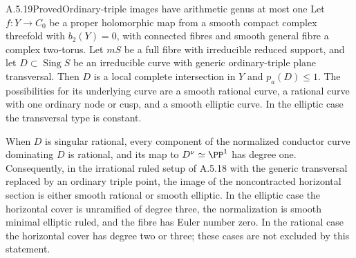 \begin{statement}{A.5.19}{Proved}{Ordinary-triple images have arithmetic genus at most one}
Let $f:Y\to C_0$ be a proper holomorphic map from a smooth
compact complex threefold with $b_2(Y)=0$, with connected
fibres and smooth general fibre a complex two-torus.
Let $mS$ be a full fibre with irreducible reduced support,
and let $D\subset\operatorname{Sing}S$ be an irreducible
curve with generic ordinary-triple plane transversal.
Then $D$ is a local complete intersection in $Y$ and
$p_a(D)\le1$. The possibilities for its underlying curve
are a smooth rational curve, a rational curve with one
ordinary node or cusp, and a smooth elliptic curve.
In the elliptic case the transversal type is constant.

When $D$ is singular rational, every component of the
normalized conductor curve dominating $D$ is rational,
and its map to $D^\nu\simeq\PP^1$ has degree one.
Consequently, in the irrational ruled setup of A.5.18
with the generic transversal replaced by an ordinary
triple point, the image of the noncontracted horizontal
section is either smooth rational or smooth elliptic.
In the elliptic case the horizontal cover is unramified
of degree three, the normalization is smooth minimal
elliptic ruled, and the fibre has Euler number zero.
In the rational case the horizontal cover has degree
two or three; these cases are not excluded by this
statement.
\end{statement}
